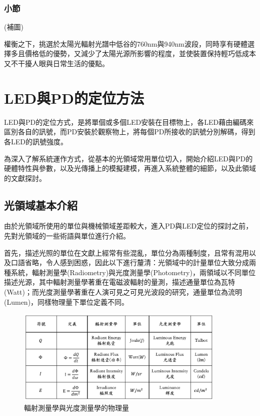 

        \subsubsection{小節}
        \hspace*{\fill}
        
        (補圖)

        權衡之下，挑選於太陽光輻射光譜中低谷的760nm與940nm波段，同時享有硬體選擇多且價格低的優勢，又減少了太陽光源所影響的程度，並使裝置保持輕巧低成本又不干擾人眼與日常生活的優點。

\section{LED與PD的定位方法}

    LED與PD的定位方式，是將單個或多個LED安裝在目標物上，各LED藉由編碼來區別各自的訊號，而PD安裝於觀察物上，將每個PD所接收的訊號分別解碼，得到各LED的訊號強度。

    為深入了解系統運作方式，從基本的光領域常用單位切入，開始介紹LED與PD的硬體特性與參數，以及光傳播上的模擬建模，再進入系統整體的細節，以及此領域的文獻探討。

    \subsection{光領域基本介紹}
        
        由於光領域所使用的單位與機械領域差距較大，進入PD與LED定位的探討之前，先對光領域的一些術語與單位進行介紹。

        首先，描述光照的單位在文獻上經常有些混亂，單位分為兩種制度，且常有混用以及口語省略，令人感到困惑，因此以下進行釐清：光領域中的計量單位大致分成兩種系統，輻射測量學(Radiometry)與光度測量學(Photometry)，兩領域以不同單位描述光源，其中輻射測量學著重在電磁波輻射的量測，描述通量單位為瓦特(Watt)；而光度測量學著重在人演可見之可見光波段的研究，通量單位為流明(Lumen)，同樣物理量下單位定義不同。\cite{radiometry_and_photometry}
        

        \begin{figure}[ht]
            \centering
            \caption{輻射測量學與光度測量學的物理量}
            \label{tab:photometry}
            \includegraphics[width=10cm]{ch2pic/photometry_table.png}
        \end{figure}



